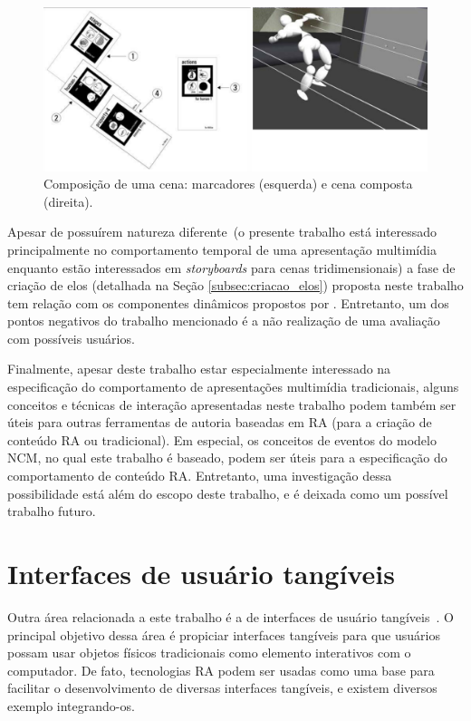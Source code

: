 \documentclass[../main.tex]{subfiles}
\begin{document}
\begin{figure}[!h]
\centering
\includegraphics[width=1\linewidth]{IMG/Relacionados/shin.png}
\caption{Composição de uma cena: marcadores (esquerda) e cena composta (direita).}
\label{fig:shin}
\end{figure}

Apesar de possuírem natureza diferente~(o presente trabalho está interessado principalmente no comportamento temporal de uma apresentação multimídia enquanto  estão interessados em \emph{storyboards} para cenas tridimensionais) a fase de criação de elos (detalhada na Seção \ref{subsec:criacao_elos}) proposta neste trabalho tem relação com os componentes dinâmicos propostos por . Entretanto, um dos pontos negativos do trabalho mencionado é a não realização de uma avaliação com possíveis usuários. 



Finalmente, apesar deste trabalho estar especialmente interessado na especificação do comportamento de apresentações multimídia tradicionais, alguns conceitos e técnicas de interação apresentadas neste trabalho podem também ser úteis para outras ferramentas de autoria baseadas em RA (para a criação de conteúdo RA ou tradicional). Em especial, os conceitos de eventos do modelo NCM, no qual este trabalho é baseado, podem ser úteis para a especificação do comportamento de conteúdo RA. Entretanto, uma investigação dessa possibilidade está além do escopo deste trabalho, e é deixada como um possível trabalho futuro. 

\section{Interfaces de usuário tangíveis}
\label{sec:interfaces_tangiveis}

Outra área relacionada a este trabalho é a de interfaces de usuário tangíveis~\cite{ishii_tangible_2008}. O principal objetivo dessa área é propiciar interfaces tangíveis para que usuários possam usar objetos físicos tradicionais como elemento interativos com o computador. De fato, tecnologias RA podem ser usadas como uma base para facilitar o desenvolvimento de diversas interfaces tangíveis, e existem diversos exemplo integrando-os. 
\end{document}
